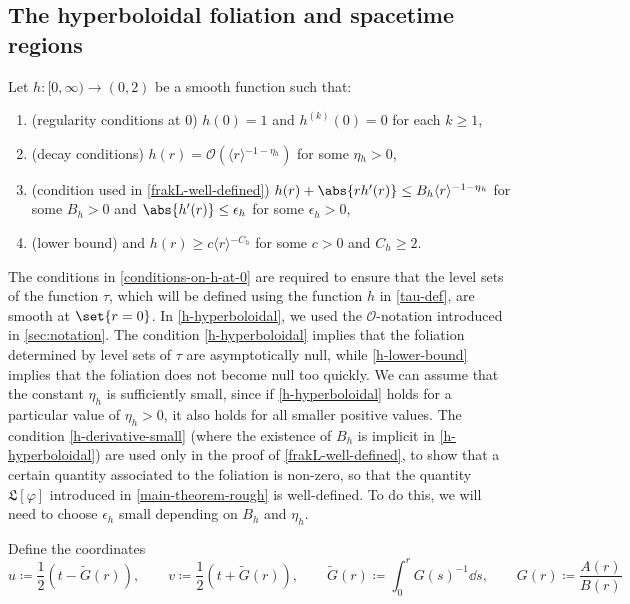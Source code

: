 \documentclass[10pt, reqno]{amsart}
\begin{document}
\subsection{The hyperboloidal foliation and spacetime regions}
\label{hyperboloidal-foliation} Let \(h : [0,\infty)\to (0,2)\) be a smooth function such that:
\begin{enumerate}
\item \label{conditions-on-h-at-0} (regularity conditions at \(0\)) \(h(0) = 1\) and \(h^{(k)}(0) = 0\) for each \(k\ge
   1\),
\item \label{h-hyperboloidal} (decay conditions) \(h(r) = \mathcal{O}(\langle{}r\rangle{}^{-1-\eta{}_h})\) for some \(\eta{}_h>0\),
\item \label{h-derivative-small} (condition used in \cref{frakL-well-defined}) \(h(r) +
   \abs{rh'(r)}\le B_h\langle{}r\rangle^{-1-\eta{}_h}\) for some \(B_h > 0\) and  \(\abs{h'(r)}\le \epsilon_h\) for some \(\epsilon_h > 0\),
\item \label{h-lower-bound} (lower bound) and \(h(r)\ge c\langle{}r\rangle{}^{-C_h}\) for some \(c>0\) and \(C_h\ge 2\).
\end{enumerate}
\begin{remark}
The conditions in \cref{conditions-on-h-at-0} are required to ensure that the level
sets of the function \(\tau{}\), which will be defined using the function \(h\)
in \cref{tau-def}, are smooth at \(\set{r=0}\). In \cref{h-hyperboloidal}, we used the
\(\mathcal{O}\)-notation introduced in \cref{sec:notation}. The condition
\cref{h-hyperboloidal} implies that the foliation determined by level sets of
\(\tau{}\) are asymptotically null, while \cref{h-lower-bound} implies that the
foliation does not become null too quickly. We can assume that the constant
\(\eta_h\) is sufficiently small, since if \cref{h-hyperboloidal} holds for a
particular value of \(\eta_h > 0\), it also holds for all smaller positive
values. The condition \cref{h-derivative-small} (where the existence of \(B_h\) is
implicit in \cref{h-hyperboloidal}) are used only
in the proof of \cref{frakL-well-defined}, to show that a certain quantity
associated to the foliation is non-zero, so that the quantity
\(\mathfrak{L}[\varphi{}]\) introduced in \cref{main-theorem-rough} is
well-defined. To do this, we will need to choose \(\epsilon_h\) small depending
on \(B_h\) and \(\eta_h\).
\end{remark}
Define the coordinates
\begin{equation}\label{double-null-coords}
u \coloneqq{} \frac{1}{2}(t-\tilde{G}(r)),\qquad v \coloneqq{} \frac{1}{2}(t+\tilde{G}(r)), \qquad \tilde{G}(r) \coloneqq{} \int_0^r G(s)^{-1}\dd{}s,\qquad G(r) \coloneqq{} \frac{A(r)}{B(r)}
\end{equation}
\end{document}
